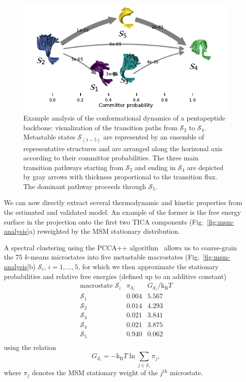 \documentclass[9pt,tutorial]{livecoms}
\begin{document}
\begin{figure}
\includegraphics{figure_6}
\caption{Example analysis of the conformational dynamics of a pentapeptide backbone:
visualization of the transition paths from $\mathcal{S}_2$ to $\mathcal{S}_4$.
Metastable states $\mathcal{S}_{(1-5)}$ are represented by an ensemble of representative structures and are arranged along the horizonal axis according to their committor probabilities.
The three main transition pathways starting from $\mathcal{S}_2$ and ending in $\mathcal{S}_4$ are depicted by gray arrows with thickness proportional to the transition flux.
The dominant pathway proceeds through $\mathcal{S}_5$.}
\label{fig:tpt-network}
\end{figure}

We can now directly extract several thermodynamic and kinetic properties from the estimated and validated model.
An example of the former is the free energy surface in the projection onto the first two TICA components
(Fig.~\ref{fig:msm-analysis}a) reweighted by the MSM stationary distribution.

A spectral clustering using the PCCA++ algorithm~\cite{pcca++,Deuflhard2005-pcca,Kube2007-pcca+}
allows us to coarse-grain the $75$ $k$-means microstates into five metastable macrostates
(Fig.~\ref{fig:msm-analysis}b) $\mathcal{S}_i$, $i=1,\dots,5$,
for which we then approximate the stationary probabilities and relative free energies
(defined up to an additive constant)
\[ \begin{array}{ccc}
\textrm{macrostate } \mathcal{S}_i & \pi_{\mathcal{S}_i} & G_{\mathcal{S}_i} / \textrm{k}_\textrm{B} T \\
\hline
\mathcal{S}_1 & 0.004 & 5.567 \\
\mathcal{S}_2 & 0.014 & 4.293 \\
\mathcal{S}_3 & 0.021 & 3.841 \\
\mathcal{S}_4 & 0.021 & 3.875 \\
\mathcal{S}_5 & 0.940 & 0.062 \\
\end{array}\]
using the relation
\begin{equation}
\label{eq:fe}
G_{\mathcal{S}_i} = - \textrm{k}_\textrm{B} T \ln \sum\limits_{j\in \mathcal{S}_i} \pi_j,
\end{equation}
where $\pi_j$ denotes the MSM stationary weight of the $j^\textrm{th}$ microstate.
\end{document}
